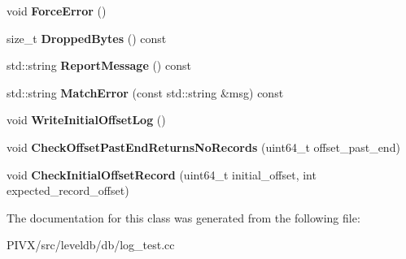 \begin{DoxyCompactItemize}
void {\bfseries Force\+Error} ()
\item 
\mbox{\label{classleveldb_1_1log_1_1_log_test_a092d7cb6d95b2f101d89dbee74ee15ad}} 
size\+\_\+t {\bfseries Dropped\+Bytes} () const
\item 
\mbox{\label{classleveldb_1_1log_1_1_log_test_a2010f1dfcd23d4cdf295909d0a00ba84}} 
std\+::string {\bfseries Report\+Message} () const
\item 
\mbox{\label{classleveldb_1_1log_1_1_log_test_a51c102136e6f0b4b9567ebad8dff74f1}} 
std\+::string {\bfseries Match\+Error} (const std\+::string \&msg) const
\item 
\mbox{\label{classleveldb_1_1log_1_1_log_test_af0053e30c5ccaa5e2e10d595a4f48565}} 
void {\bfseries Write\+Initial\+Offset\+Log} ()
\item 
\mbox{\label{classleveldb_1_1log_1_1_log_test_a2bf9cdf3b3f722c300f65a7752c0e101}} 
void {\bfseries Check\+Offset\+Past\+End\+Returns\+No\+Records} (uint64\+\_\+t offset\+\_\+past\+\_\+end)
\item 
\mbox{\label{classleveldb_1_1log_1_1_log_test_ab9ca8c2014e78611d66d884f7b46e4ff}} 
void {\bfseries Check\+Initial\+Offset\+Record} (uint64\+\_\+t initial\+\_\+offset, int expected\+\_\+record\+\_\+offset)
\end{DoxyCompactItemize}


The documentation for this class was generated from the following file\+:\begin{DoxyCompactItemize}
\item 
P\+I\+V\+X/src/leveldb/db/log\+\_\+test.\+cc\end{DoxyCompactItemize}
